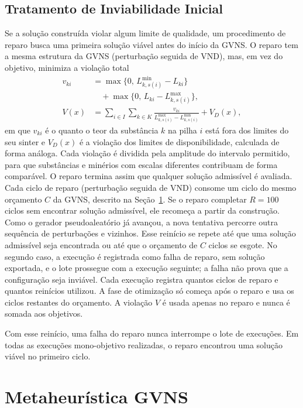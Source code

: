 \documentclass[conference]{IEEEtran}
\begin{document}
\subsection{Tratamento de Inviabilidade Inicial}

Se a solução construída violar algum limite de qualidade, um procedimento de reparo busca uma primeira solução viável antes do início da GVNS. O reparo tem a mesma estrutura da GVNS (perturbação seguida de VND), mas, em vez do objetivo, minimiza a violação total
\begin{align}
v_{ki} &= \max\{0,\, L_{k,s(i)}^{\min} - L_{ki}\} \nonumber \\
       &\quad + \max\{0,\, L_{ki} - L_{k,s(i)}^{\max}\}, \\
V(x)   &= \sum_{i \in I} \sum_{k \in K}
          \frac{v_{ki}}{L_{k,s(i)}^{\max} - L_{k,s(i)}^{\min}} + V_D(x),
\end{align}
em que $v_{ki}$ é o quanto o teor da substância $k$ na pilha $i$ está fora dos limites do seu sinter e $V_D(x)$ é a violação dos limites de disponibilidade, calculada de forma análoga. Cada violação é dividida pela amplitude do intervalo permitido, para que substâncias e minérios com escalas diferentes contribuam de forma comparável. O reparo termina assim que qualquer solução admissível é avaliada. Cada ciclo de reparo (perturbação seguida de VND) consome um ciclo do mesmo orçamento $C$ da GVNS, descrito na Seção~\ref{sec:gvns}. Se o reparo completar $R=100$ ciclos sem encontrar solução admissível, ele recomeça a partir da construção. Como o gerador pseudoaleatório já avançou, a nova tentativa percorre outra sequência de perturbações e vizinhos. Esse reinício se repete até que uma solução admissível seja encontrada ou até que o orçamento de $C$ ciclos se esgote. No segundo caso, a execução é registrada como falha de reparo, sem solução exportada, e o lote prossegue com a execução seguinte; a falha não prova que a configuração seja inviável. Cada execução registra quantos ciclos de reparo e quantos reinícios utilizou. A fase de otimização só começa após o reparo e usa os ciclos restantes do orçamento. A violação $V$ é usada apenas no reparo e nunca é somada aos objetivos.

Com esse reinício, uma falha do reparo nunca interrompe o lote de execuções. Em todas as execuções mono-objetivo realizadas, o reparo encontrou uma solução viável no primeiro ciclo.

\section{Metaheurística GVNS}\label{sec:gvns}
\end{document}
